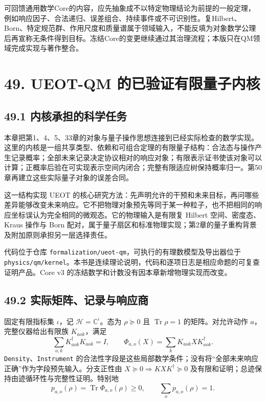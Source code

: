 \documentclass[
  11pt,
  oneside]{book}
\begin{document}
可回馈通用数学Core的内容，应先抽象成不以特定物理结论为前提的一般定理，例如响应因子、合法递归、误差组合、持续事件或不可识别性。复Hilbert、Born、特定规范群、作用尺度和质量谱属于领域输入，不能反填为对象数学公理后再宣称无条件得到目标。冻结Core的变更继续通过其治理流程；本版只在QM领域完成实现与著作整合。

\hypertarget{ch-49}{%
\chapter{49. UEOT-QM 的已验证有限量子内核}\label{ch-49}}

\hypertarget{ux5185ux6838ux627fux62c5ux7684ux79d1ux5b66ux4efbux52a1}{%
\section{49.1
内核承担的科学任务}\label{ux5185ux6838ux627fux62c5ux7684ux79d1ux5b66ux4efbux52a1}}

本章把第1、4、5、33章的对象与量子操作思想连接到已经实际检查的数学实现。这里的内核是一组共享类型、依赖和可组合定理的有限量子结构：合法态与操作产生记录概率；全部未来记录决定协议相对的响应对象；有限表示证书使该对象可以计算；正概率后验在可实现表示空间内闭合；完整有限适应树保持概率归一。第50章再建立这些实际量子对象的误差合同。

这一结构实现 UEOT
的核心研究方法：先声明允许的干预和未来目标，再问哪些差异能够改变未来响应。它不把物理对象预先等同于某一种粒子，也不把相同的响应坐标误认为完全相同的微观态。它的物理输入是有限复
Hilbert 空间、密度态、Kraus 操作与 Born
配对，属于量子扇区和标准物理实现；第2章的量子重构背景及附加原则承担另一层选择责任。

代码位于仓库
\texttt{formalization/ueot-qm}，可执行的有理数模型及导出器位于
\texttt{physics/qm/kernel}。本书是连续理论说明，代码和逐项日志是相应命题的可复查证明产品。Core
v3 的冻结数学和计数没有因本章新增物理实现而改变。

\hypertarget{ux5b9eux9645ux77e9ux9635ux8bb0ux5f55ux4e0eux54cdux5e94ux5546}{%
\section{49.2
实际矩阵、记录与响应商}\label{ux5b9eux9645ux77e9ux9635ux8bb0ux5f55ux4e0eux54cdux5e94ux5546}}

固定有限指标集 \(\iota\)，记 \(\mathcal H=\mathbb C^{\iota}\)。态为
\(\rho\succeq0\) 且 \(\operatorname{Tr}\rho=1\) 的矩阵。对允许动作
\(a\)，完整仪器给出有限族 \(K_{aok}\)，满足 \[
\sum_{o,k}K_{aok}^{\dagger}K_{aok}=I,
\qquad \Phi_{a,o}(X)=\sum_kK_{aok}XK_{aok}^{\dagger}.
\] \texttt{Density}、\allowbreak \texttt{Instrument}
的合法性字段是这些局部数学条件；没有将``全部未来响应正确''作为字段预先输入。分支正性由
\(X\succeq0\Rightarrow KXK^\dagger\succeq0\)
及有限和证明；总迹保持由迹循环性与完整性证明。特别地 \[
p_{a,o}(\rho)=\operatorname{Tr}\Phi_{a,o}(\rho)\ge0,
\qquad \sum_op_{a,o}(\rho)=1.
\]
\end{document}
